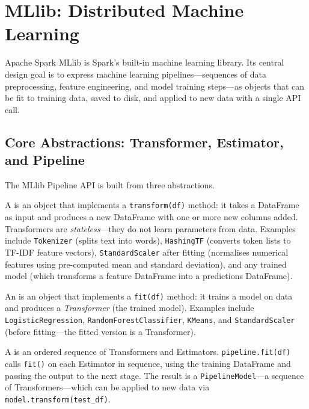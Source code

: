 \section{MLlib: Distributed Machine Learning}
\label{sec:mllib}

Apache Spark MLlib is Spark's built-in machine learning library. Its
central design goal is to express machine learning pipelines---sequences
of data preprocessing, feature engineering, and model training steps---as
 objects that can be fit to training data, saved to disk,
and applied to new data with a single API call.

\subsection{Core Abstractions: Transformer, Estimator, and Pipeline}
\label{subsec:pipeline-api}

The MLlib Pipeline API is built from three abstractions.

A  is an object that implements a \texttt{transform(df)}
method: it takes a DataFrame as input and produces a new DataFrame with
one or more new columns added. Transformers are \emph{stateless}---they
do not learn parameters from data. Examples include \texttt{Tokenizer}
(splits text into words), \texttt{HashingTF} (converts token lists to
TF-IDF feature vectors), \texttt{StandardScaler} after fitting (normalises
numerical features using pre-computed mean and standard deviation), and
any trained model (which transforms a feature DataFrame into a
predictions DataFrame).

An  is an object that implements a \texttt{fit(df)}
method: it trains a model on data and produces a \emph{Transformer}
(the trained model). Examples include \texttt{LogisticRegression},
\texttt{RandomForestClassifier}, \texttt{KMeans}, and
\texttt{StandardScaler} (before fitting---the fitted version is a
Transformer).

A  is an ordered sequence of Transformers and Estimators.
\texttt{pipeline.fit(df)} calls \texttt{fit()} on each Estimator in
sequence, using the training DataFrame and passing the output to the
next stage. The result is a \texttt{PipelineModel}---a sequence of
Transformers---which can be applied to new data via
\texttt{model.transform(test\_df)}.

